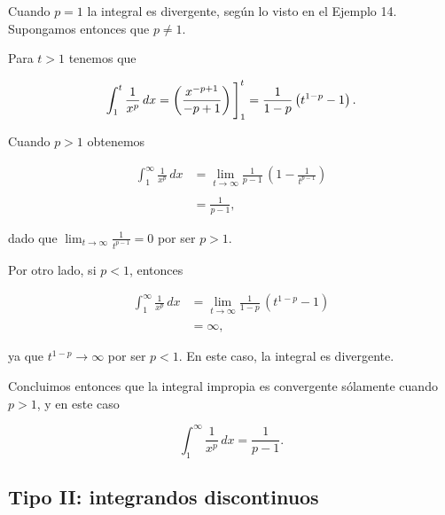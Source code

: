 \documentclass[
  letterpaper,
]{book}
\theoremstyle{plain}
\theoremstyle{remark}
\begin{document}
\begin{tcolorbox}[enhanced jigsaw, opacityback=0, left=2mm, opacitybacktitle=0.6, toprule=.15mm, bottomrule=.15mm, colbacktitle=quarto-callout-tip-color!10!white, titlerule=0mm, bottomtitle=1mm, title=\textcolor{quarto-callout-tip-color}{\faLightbulb}\hspace{0.5em}{Solución}, toptitle=1mm, colframe=quarto-callout-tip-color-frame, colback=white, breakable, rightrule=.15mm, arc=.35mm, leftrule=.75mm, coltitle=black]

Cuando \(p=1\) la integral es divergente, según lo visto en el Ejemplo
14. Supongamos entonces que \(p \ne 1\).

Para \(t>1\) tenemos que

\[
\int_1^t \frac{1}{x^p}\,dx=\left(\frac{x^{-p+1}}{-p+1}\right)\Bigg{]}_1^t=\frac{1}{1-p}\left(t^{1-p}-1\right).
\]

Cuando \(p>1\) obtenemos

\[
\begin{aligned}
\int_{1}^{\infty} \frac{1}{x^{p}}\,dx
&= \lim_{t \to \infty} \frac{1}{p - 1}\,\left(1-\frac{1}{t^{p-1}}\right)\\
\\
&=\frac{1}{p-1},
\end{aligned}
\]

dado que \(\lim_{t\to \infty} \frac{1}{t^{p-1}}=0\) por ser \(p>1\).

Por otro lado, si \(p < 1\), entonces

\[
\begin{aligned}
\int_{1}^{\infty} \frac{1}{x^{p}}\,dx
&= \lim_{t \to \infty} \frac{1}{1 - p}\,\left(t^{1-p}-1\right)\\
\\
&=\infty,
\end{aligned}
\]

ya que \(t^{1-p}\to \infty\) por ser \(p<1\). En este caso, la integral
es divergente.

Concluimos entonces que la integral impropia es convergente sólamente
cuando \(p>1\), y en este caso

\[
\int_{1}^{\infty} \frac{1}{x^{p}}\,dx=\frac{1}{p-1}.
\]

\end{tcolorbox}

\subsection{Tipo II: integrandos
discontinuos}\label{tipo-ii-integrandos-discontinuos}
\end{document}

